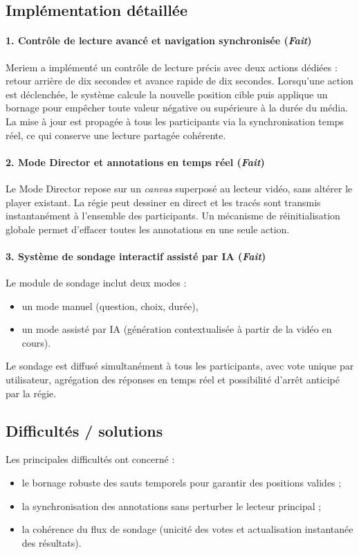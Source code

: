\documentclass[11pt,a4paper]{report}
\begin{document}
\subsection{Implémentation détaillée}
\paragraph{1. Contrôle de lecture avancé et navigation synchronisée (\textit{Fait})}
Meriem a implémenté un contrôle de lecture précis avec deux actions dédiées : retour arrière de dix secondes et avance rapide de dix secondes. Lorsqu'une action est déclenchée, le système calcule la nouvelle position cible puis applique un bornage pour empêcher toute valeur négative ou supérieure à la durée du média. La mise à jour est propagée à tous les participants via la synchronisation temps réel, ce qui conserve une lecture partagée cohérente.

\paragraph{2. Mode Director et annotations en temps réel (\textit{Fait})}
Le Mode Director repose sur un \textit{canvas} superposé au lecteur vidéo, sans altérer le player existant. La régie peut dessiner en direct et les tracés sont transmis instantanément à l'ensemble des participants. Un mécanisme de réinitialisation globale permet d'effacer toutes les annotations en une seule action.

\paragraph{3. Système de sondage interactif assisté par IA (\textit{Fait})}
Le module de sondage inclut deux modes :
\begin{itemize}
    \item un mode manuel (question, choix, durée),
    \item un mode assisté par IA (génération contextualisée à partir de la vidéo en cours).
\end{itemize}
Le sondage est diffusé simultanément à tous les participants, avec vote unique par utilisateur, agrégation des réponses en temps réel et possibilité d'arrêt anticipé par la régie.
\subsection{Difficultés / solutions}
Les principales difficultés ont concerné :
\begin{itemize}
    \item le bornage robuste des sauts temporels pour garantir des positions valides ;
    \item la synchronisation des annotations sans perturber le lecteur principal ;
    \item la cohérence du flux de sondage (unicité des votes et actualisation instantanée des résultats).
\end{itemize}
\end{document}

